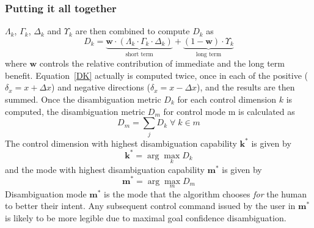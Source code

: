\documentclass[conference]{IEEEtran}
\newcommand{\argmax}{\arg\!\max}
\begin{document}
\subsubsection*{Putting it all together}
$\Lambda_{k}$, $\Gamma_{k}$, $\Delta_{k}$ and $\Upsilon_{k}$ are then combined to compute $D_{k}$ as 
\begin{equation}\label{DK}
D_{k} = \underbrace{\boldsymbol{w}\cdot(\Lambda_{k}\cdot \Gamma_{k}\cdot \Delta_{k})}_{\text{short term}} + \underbrace{(1 - \boldsymbol{w})\cdot \Upsilon_{k}}_{\text{long term}}
\end{equation}
where $\boldsymbol{w}$ controls the relative contribution of immediate and the long term benefit. Equation~\ref{DK} actually is computed twice, once in each of the positive ($\delta_x = x + \Delta x$) and negative directions ($\delta_x = x - \Delta x$), and the results are then summed. 
Once the disambiguation metric $D_k$ for each control dimension $k$ is computed, the disambiguation metric $D_m$ for control mode m is calculated as 
\begin{equation*}
D_m = \sum_{j} D_{k} \; \forall \; k \in m
\end{equation*}
The control dimension with highest disambiguation capability $\boldsymbol{k}^*$ is given by
\begin{equation*}
\boldsymbol{k}^* = \argmax_k D_{k}
\end{equation*}
 and the mode with highest disambiguation capability $\boldsymbol{m}^{*}$ is given by
\begin{equation*}
\boldsymbol{m}^* = \argmax_m D_m
\end{equation*}
Disambiguation mode $\boldsymbol{m}^{*}$ is the mode that the algorithm chooses \textit{for} the human to better their intent. Any subsequent control command issued by the user in $\boldsymbol{m}^*$ is likely to be more legible due to maximal goal confidence disambiguation.
\end{document}
